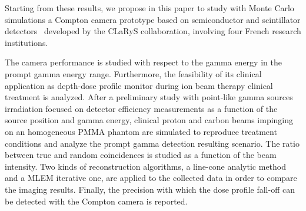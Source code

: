 Starting from these results, we propose in this paper to study with Monte Carlo simulations a Compton camera prototype based on semiconductor and scintillator detectors~\cite{krimmer:hal-01101334, Fontana2018} developed by the CLaRyS collaboration, involving four French research institutions. 

The camera performance is studied with respect to the gamma energy in the prompt gamma energy range. Furthermore, the feasibility of its clinical application as depth-dose profile monitor during ion beam therapy clinical treatment is analyzed. After a preliminary study with point-like gamma sources irradiation focused on detector efficiency measurements as a function of the source position and gamma energy, clinical proton and carbon beams impinging on an homogeneous PMMA phantom are simulated to reproduce treatment conditions and analyze the prompt gamma detection resulting scenario. The ratio between true and random coincidences is studied as a function of the beam intensity. Two kinds of reconstruction algorithms, a line-cone analytic method and a MLEM iterative one, are applied to the collected data in order to compare the imaging results. Finally, the precision with which the dose profile fall-off can be detected with the Compton camera is reported.   


